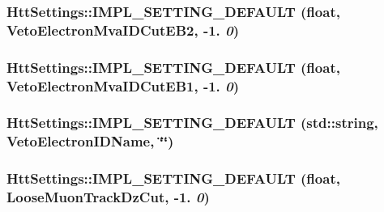 \label{classHttSettings_a448ca7df803175d519a22dcd7a9fbc84}
\hypertarget{classHttSettings_a338306a6253ee9ac8fa07e1910ec732e}{
\subsubsection[{IMPL\_\-SETTING\_\-DEFAULT}]{\setlength{\rightskip}{0pt plus 5cm}HttSettings::IMPL\_\-SETTING\_\-DEFAULT (float, \/  VetoElectronMvaIDCutEB2, \/  -\/1. {\em 0})}}
\label{classHttSettings_a338306a6253ee9ac8fa07e1910ec732e}
\hypertarget{classHttSettings_abd06ccd89c1669d409d252f47f5b71cd}{
\subsubsection[{IMPL\_\-SETTING\_\-DEFAULT}]{\setlength{\rightskip}{0pt plus 5cm}HttSettings::IMPL\_\-SETTING\_\-DEFAULT (float, \/  VetoElectronMvaIDCutEB1, \/  -\/1. {\em 0})}}
\label{classHttSettings_abd06ccd89c1669d409d252f47f5b71cd}
\hypertarget{classHttSettings_a2de0dba895bb5dc411cd51818a8c21d2}{
\subsubsection[{IMPL\_\-SETTING\_\-DEFAULT}]{\setlength{\rightskip}{0pt plus 5cm}HttSettings::IMPL\_\-SETTING\_\-DEFAULT (std::string, \/  VetoElectronIDName, \/  \char`\"{}\char`\"{})}}
\label{classHttSettings_a2de0dba895bb5dc411cd51818a8c21d2}
\hypertarget{classHttSettings_a373287cc228b1a0f8b92edee173e9ac9}{
\subsubsection[{IMPL\_\-SETTING\_\-DEFAULT}]{\setlength{\rightskip}{0pt plus 5cm}HttSettings::IMPL\_\-SETTING\_\-DEFAULT (float, \/  LooseMuonTrackDzCut, \/  -\/1. {\em 0})}}
\label{classHttSettings_a373287cc228b1a0f8b92edee173e9ac9}
